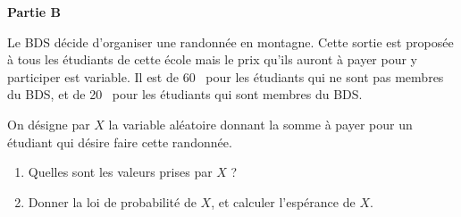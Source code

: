 \documentclass[10pt]{article}
\providecommand{\euro}{\texteuro}
\providecommand{\euro}{{\text{€}}}
\renewcommand{\euro}{\ifmmode\text{\texteuro}\else\texteuro\fi}
\begin{document}
\medskip

\textbf{Partie B}

\medskip

Le BDS décide d'organiser une randonnée en montagne. Cette sortie est proposée à tous les étudiants de cette école mais le prix qu'ils auront à payer pour y participer est variable. Il est de 60~\euro{} pour les étudiants qui ne sont pas membres du BDS, et de 20~\euro{} pour les étudiants qui sont membres du BDS.

On désigne par $X$ la variable aléatoire donnant la somme à payer pour un étudiant qui désire
faire cette randonnée.

\begin{enumerate}
\item Quelles sont les valeurs prises par $X$ ?
\item Donner la loi de probabilité de $X$, et calculer l'espérance de $X$.
\end{enumerate}

\vspace{0,5cm}
\end{document}
